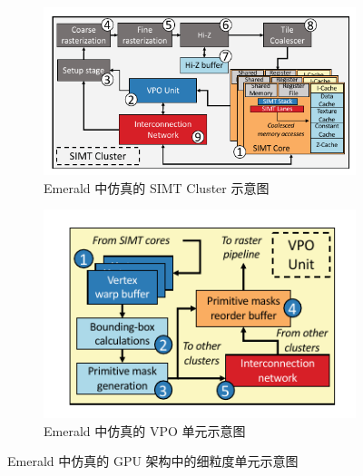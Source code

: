 \begin{figure}
    \centering
    \begin{minipage}[b]{\textwidth}
        \begin{subfigure}[b]{0.48\textwidth}
            \includegraphics[width=\textwidth, trim=5 0 0 0, clip]{figures/emerald_simt_cluster.pdf}
            \caption{Emerald 中仿真的 SIMT Cluster 示意图}
            \label{fig:sub_simt}
        \end{subfigure}
        \begin{subfigure}[b]{0.48\textwidth}
            \includegraphics[width=\textwidth, trim=0 5 0 0]{figures/emerald_vpo_unit.pdf}
            \caption{Emerald 中仿真的 VPO 单元示意图}
            \label{fig:sub_vpo}
        \end{subfigure}
    \end{minipage}
    

    \caption{Emerald 中仿真的 GPU 架构中的细粒度单元示意图\cite{10.1145/3307650.3322221}}
    \label{fig:emerald_units}
\end{figure}

